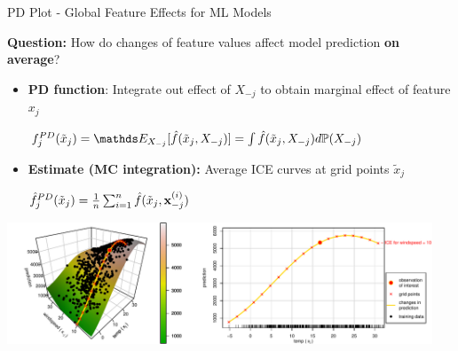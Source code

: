 \documentclass[11pt,compress,t,notes=noshow, aspectratio=169, xcolor=table,dvipsnames]{beamer}
\begin{document}
\begin{frame}{PD Plot - Global Feature Effects for ML Models}

\textbf{Question:} How do changes of feature values affect model prediction \textbf{on average}?


\begin{itemize}
    \item \textbf{PD function}: Integrate out effect of $X_{-j}$ to obtain marginal effect of feature $x_j$
    
    \medskip
    
    \centerline{$ \textstyle
    f_j^{PD}(\tilde x_j) = \E_{X_{-j}}[\hat f(\tilde x_j, X_{-j})] = \int \hat f(\tilde x_j, X_{-j}) d \mathbb{P}(X_{-j})
    $}

    \smallskip
    
    \item \textbf{Estimate (MC integration):} Average ICE curves at grid points $\tilde x_j$
    
    \medskip
    
    \centerline{$ \textstyle
    \hat f_j^{PD}(\tilde x_j) = \frac{1}{n} \sum_{i=1}^{n} \hat f(\tilde x_j, \mathbf{x}_{-j}^{(i)})
    $}
\end{itemize}


\vfill
\centering
\includegraphics[width=0.95\textwidth, page = 2]{figure/ice_motivation_bike}

\end{frame}
\end{document}
